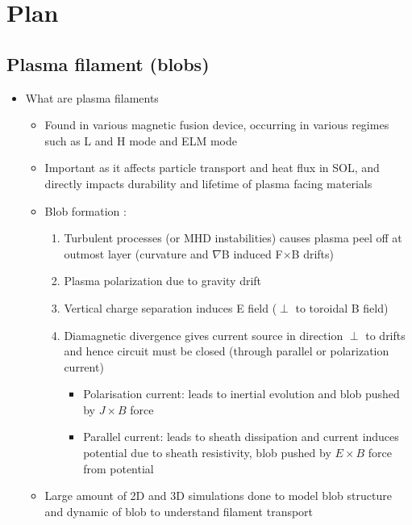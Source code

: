 \documentclass{article}
\begin{document}
\section*{Plan}
\subsection*{Plasma filament (blobs)}
\begin{itemize}
    \item What are plasma filaments
    \begin{itemize}
        \item Found in various magnetic fusion device, occurring in various regimes such as L and H mode \cite{boedo_transport_2003} and ELM mode \cite{ben_ayed_inter-elm_2009}
        \item Important as it affects particle transport and heat flux in SOL, and directly impacts durability and lifetime of plasma facing materials \cite{carralero_experimental_2015, krasheninnikov_recent_2008}
        \item Blob formation \cite{krasheninnikov_recent_2008}:
        \begin{enumerate}
            \item Turbulent processes (or MHD instabilities) causes plasma peel off at outmost layer (curvature and $\nabla$B induced F$\times$B drifts)
            \item Plasma polarization due to gravity drift
            \item Vertical charge separation induces E field ($\perp$ to toroidal B field)
            \item Diamagnetic divergence gives current source in direction $\perp$ to drifts and hence circuit must be closed (through parallel or polarization current) \cite{omotani_effects_2015}
            \begin{itemize}
                \item Polarisation current: leads to inertial evolution and blob pushed by $J\times B$ force
                \item Parallel current: leads to sheath dissipation and current induces potential due to sheath resistivity, blob pushed by $E\times B$ force from potential
            \end{itemize}
        \end{enumerate}
        \item Large amount of 2D and 3D simulations \cite{omotani_effects_2015, easy_three_2014, nespoli_3d_2019, garcia_mechanism_2005, shanahan_fluid_2018} done to model blob structure and dynamic of blob to understand filament transport  

\end{itemize}
\end{itemize}
\end{document}
